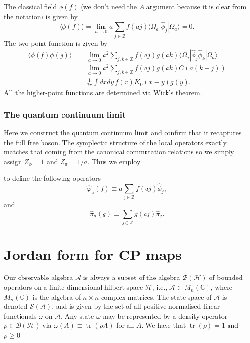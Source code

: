 \documentclass[prl,twocolumn,lengthcheck,superscriptaddress]{revtex4-1}
\newcommand{\tr}{\operatorname{tr}}
\theoremstyle{definition}
\theoremstyle{remark}
\begin{document}
The classical field $\phi(f)$ (we don't need the $A$ argument because it is clear from the notation) is given by
\begin{equation}
	\langle \phi(f)\rangle = \lim_{a\rightarrow 0} a\sum_{j\in \mathbb{Z}} f(aj) \langle \Omega_a| \widehat{\phi}_j |\Omega_a\rangle = 0.
\end{equation}
The two-point function is given by
\begin{equation}
	\begin{split}
	\langle \phi(f)\phi(g)\rangle &= \lim_{a\rightarrow 0} a^2\sum_{j,k\in \mathbb{Z}} f(aj)g(ak) \langle \Omega_a| \widehat{\phi}_j\widehat{\phi}_k |\Omega_a\rangle \\
	&= \lim_{a\rightarrow 0} a^2\sum_{j,k\in \mathbb{Z}} f(aj)g(ak) C(a(k-j)) \\
	&= \frac{1}{2\pi}\int dx dy \, f(x) K_0(x-y) g(y).
	\end{split}
\end{equation}
All the higher-point functions are determined via Wick's theorem.

\subsubsection{The quantum continuum limit}
Here we construct the quantum continuum limit and confirm that it recaptures the full free boson. The symplectic structure of the local operators exactly matches that coming from the canonical commutation relations so we simply assign $Z_{\phi} = 1$ and $Z_{\pi} = 1/a$. Thus we employ 

to define the following operators
\begin{equation}
	\widehat{\varphi}_a(f) \equiv a\sum_{j\in \mathbb{Z}} f(aj) \widehat{\phi}_j,
\end{equation}
and
\begin{equation}
	\widehat{\pi}_a(g) \equiv \sum_{j\in \mathbb{Z}} g(aj) \widehat{\pi}_j.
\end{equation}

\section{Jordan form for CP maps}

Our observable algebra $\mathcal{A}$ is always a subset of the algebra $\mathcal{B}(\mathcal{H})$ of bounded operators on a finite dimensional hilbert space $\mathcal{H}$, i.e., $\mathcal{A}\subset M_n(\mathbb{C})$, where $M_n(\mathbb{C})$ is the algebra of $n\times n$ complex matrices. The state space of $\mathcal{A}$ is denoted $\mathcal{S}(\mathcal{A})$, and is given by the set of all positive normalised linear functionals $\omega$ on $\mathcal{A}$.  Any state $\omega$ may be represented by a density operator $\rho \in \mathcal{B}(\mathcal{H})$ via $\omega(A) \equiv \tr(\rho A)$ for all $A$. We have that $\tr(\rho) = 1$ and $\rho \ge 0$. 
\end{document}

